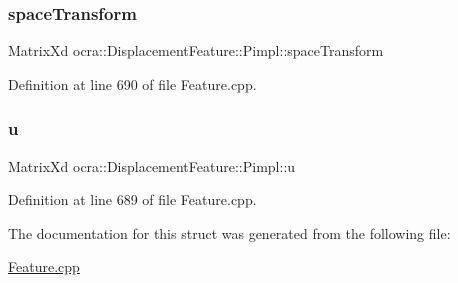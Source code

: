 \hypertarget{structocra_1_1DisplacementFeature_1_1Pimpl_ae4f3165c1ca46e3d14cb9fdeab2297a0}{}\label{structocra_1_1DisplacementFeature_1_1Pimpl_ae4f3165c1ca46e3d14cb9fdeab2297a0} 
\subsubsection{\texorpdfstring{space\+Transform}{spaceTransform}}
{\footnotesize\ttfamily Matrix\+Xd ocra\+::\+Displacement\+Feature\+::\+Pimpl\+::space\+Transform}



Definition at line 690 of file Feature.\+cpp.

\hypertarget{structocra_1_1DisplacementFeature_1_1Pimpl_a7ee31c021de6d56a80cfe6bebac34af1}{}\label{structocra_1_1DisplacementFeature_1_1Pimpl_a7ee31c021de6d56a80cfe6bebac34af1} 
\subsubsection{\texorpdfstring{u}{u}}
{\footnotesize\ttfamily Matrix\+Xd ocra\+::\+Displacement\+Feature\+::\+Pimpl\+::u}



Definition at line 689 of file Feature.\+cpp.



The documentation for this struct was generated from the following file\+:\begin{DoxyCompactItemize}
\item 
\hyperlink{Feature_8cpp}{Feature.\+cpp}\end{DoxyCompactItemize}
